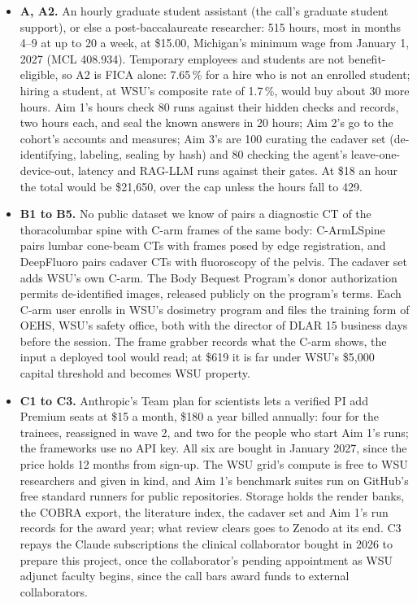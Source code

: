 \documentclass[10pt,letterpaper]{article}
\newcommand{\pct}{\,\%}
\begin{document}
\begin{itemize}[leftmargin=1.1em,itemsep=2pt]
\item \textbf{A, A2.} An hourly graduate student assistant (the call's
graduate student support), or else a post-baccalaureate researcher: 515 hours, most in months 4--9 at up to 20 a week, at \$15.00, Michigan's minimum wage from January 1,
  2027 (MCL 408.934). Temporary employees and students are not benefit-eligible,
  so A2 is FICA alone: 7.65\pct{} for a hire who is not an enrolled student; hiring a student, at
WSU's composite rate of 1.7\pct{}, would buy about 30 more hours. Aim 1's hours check 80 runs against
  their hidden checks and records, two hours each, and seal the known answers in 20 hours; Aim 2's go to the cohort's accounts and measures; Aim 3's are 100 curating the cadaver set
  (de-identifying, labeling, sealing by hash) and 80 checking the agent's leave-one-device-out, latency and RAG-LLM runs against their gates. At \$18 an hour the total would be \$21,650, over the cap unless the hours fall to 429.
\item \textbf{B1 to B5.} No public dataset we know of pairs a diagnostic CT of the thoracolumbar spine with C-arm
  frames of the same body: C-ArmLSpine pairs lumbar cone-beam CTs with frames posed by edge registration, and
  DeepFluoro pairs cadaver CTs with fluoroscopy of the pelvis. The cadaver set
adds WSU's own C-arm. The Body Bequest Program's donor authorization permits de-identified images,
  released publicly on the program's terms. Each C-arm user enrolls in WSU's dosimetry program and files the training form of OEHS, WSU's safety
office, both with the director of DLAR 15 business days before the session. The frame grabber records what the C-arm shows, the input
a deployed tool would read; at \$619 it is far under WSU's
  \$5,000 capital threshold and becomes WSU property.
\item \textbf{C1 to C3.} Anthropic's Team plan for scientists lets a verified PI add Premium seats at \$15 a month,
  \$180 a year billed annually: four for the trainees, reassigned in wave 2, and two for the people who start Aim 1's runs; the frameworks use no API key. All six
are bought in January 2027, since the price holds 12 months from sign-up. The WSU grid's compute is free to WSU researchers and given
  in kind, and Aim 1's benchmark suites run on GitHub's free standard runners for public repositories. Storage holds the render banks, the COBRA export, the literature index, the cadaver set and Aim 1's run records for the award year; what review
  clears goes to Zenodo at its end. C3 repays the Claude subscriptions the clinical collaborator bought in 2026 to prepare this project, once the collaborator's pending appointment as WSU adjunct faculty begins, since the call bars award funds to external collaborators.

\end{itemize}
\end{document}
